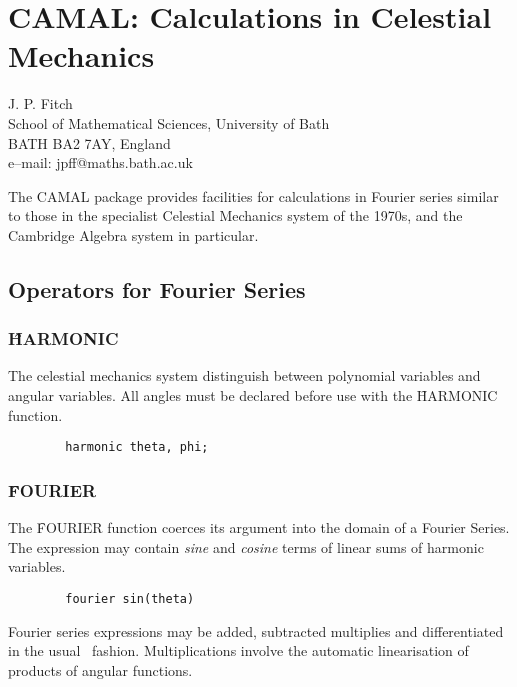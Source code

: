 \chapter[CAMAL: Celestial Mechanics]{CAMAL: Calculations in Celestial Mechanics} 
\label{CAMAL}

{\footnotesize
\begin{center}
J. P. Fitch \\
School of Mathematical Sciences, University of Bath\\
BATH BA2 7AY, England \\[0.05in]
e--mail: jpff@maths.bath.ac.uk
\end{center}
}

The CAMAL package provides facilities for calculations in Fourier
series similar to those in the specialist Celestial Mechanics system
of the 1970s, and the Cambridge Algebra system in
particular. 

\section{Operators for Fourier Series}

\subsection*{\f{HARMONIC}}

The celestial mechanics system distinguish between polynomial
variables and angular variables.  All angles must be declared before
use with the \f{HARMONIC} function. 
\begin{verbatim}
        harmonic theta, phi;
\end{verbatim}


\subsection*{\f{FOURIER}}

The \f{FOURIER} function coerces its argument into the domain of a
Fourier Series.   The expression may contain {\em sine} and {\em
cosine} terms of linear sums of harmonic variables.
\begin{verbatim}
        fourier sin(theta)
\end{verbatim}

Fourier series expressions may be added, subtracted multiplies and
differentiated in the usual \REDUCE\ fashion.  Multiplications involve
the automatic linearisation of products of angular functions.

